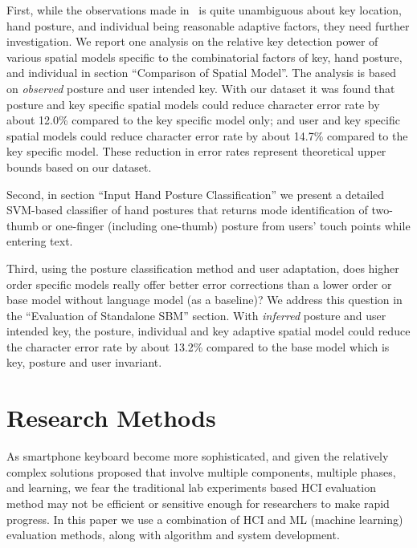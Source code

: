 \documentclass{sigchi}
\begin{document}
First, while the observations made in~\cite{Azenkot:2012} is quite unambiguous about key location, hand posture, and individual being reasonable adaptive factors, they need further investigation.  We report one analysis on the relative key detection power of various spatial models specific to the combinatorial factors of key, hand posture,  and individual in section ``Comparison of Spatial Model''. The analysis is based on \textit{observed} posture and user intended key. With our dataset it was found that posture and key specific spatial models could reduce character error rate by about 12.0\% compared to the key specific model only; and user and key specific spatial models could reduce character error rate by about 14.7\% compared to the key specific model. These reduction in error rates represent theoretical upper bounds based on our dataset. 

Second, in section ``Input Hand Posture Classification'' we present a detailed SVM-based classifier of hand postures that returns mode identification of two-thumb or one-finger (including one-thumb) posture from users' touch points while entering text.

Third, using the posture classification method and user adaptation, does higher order specific models really offer better error corrections than a lower order or base model without language model (as a baseline)? We address this question in the ``Evaluation of Standalone SBM'' section. With \textit{inferred} posture and user intended key, the posture, individual and key adaptive spatial model could reduce the character error rate by about 13.2\% compared to the base model which is key, posture and user invariant.

\section{Research Methods}
As smartphone keyboard become more sophisticated, and given the relatively complex solutions proposed that involve multiple components, multiple phases, and learning,  we fear the traditional lab experiments based HCI evaluation method may not be efficient or sensitive enough for researchers to make rapid progress. In this paper we use a combination of HCI and ML (machine learning) evaluation methods, along with algorithm and system development. 
\end{document}
